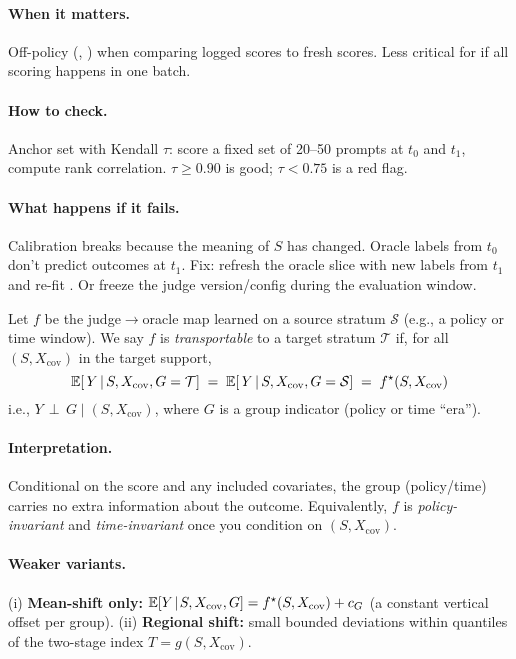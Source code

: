 \paragraph{When it matters.} Off-policy (\ips, \dr) when comparing logged scores to fresh scores. Less critical for \dm{} if all scoring happens in one batch.

\paragraph{How to check.} Anchor set with Kendall $\tau$: score a fixed set of 20--50 prompts at $t_0$ and $t_1$, compute rank correlation. $\tau \ge 0.90$ is good; $\tau < 0.75$ is a red flag.

\paragraph{What happens if it fails.} Calibration breaks because the meaning of $S$ has changed. Oracle labels from $t_0$ don't predict outcomes at $t_1$. Fix: refresh the oracle slice with new labels from $t_1$ and re-fit \autocal. Or freeze the judge version/config during the evaluation window.

\begin{assumption}
\label{assum:transport}
Let $f$ be the judge$\to$oracle map learned on a source stratum $\mathcal{S}$ (e.g., a policy or time window).
We say $f$ is \emph{transportable} to a target stratum $\mathcal{T}$ if, for all $(S, X_{\mathrm{cov}})$ in the target support,
\[
\operatorname{\mathbb{E}}\!\left[\,Y \,\middle|\, S, X_{\mathrm{cov}}, G=\mathcal{T}\right]
\;=\;
\operatorname{\mathbb{E}}\!\left[\,Y \,\middle|\, S, X_{\mathrm{cov}}, G=\mathcal{S}\right]
\;=\; f^\star(S, X_{\mathrm{cov}})
\]
i.e., $Y \,\perp\, G \mid (S, X_{\mathrm{cov}})$, where $G$ is a group indicator (policy or time ``era'').
\end{assumption}

\paragraph{Interpretation.} Conditional on the score and any included covariates, the group (policy/time) carries no extra information about the outcome. Equivalently, $f$ is \emph{policy-invariant} and \emph{time-invariant} once you condition on $(S, X_{\mathrm{cov}})$.

\paragraph{Weaker variants.}
(i) \textbf{Mean-shift only:} $\operatorname{\mathbb{E}}[Y\!\mid\!S,X_{\mathrm{cov}},G] = f^\star(S,X_{\mathrm{cov}}) + c_G$
(a constant vertical offset per group).
(ii) \textbf{Regional shift:} small bounded deviations within quantiles of the two-stage index $T=g(S,X_{\mathrm{cov}})$.


